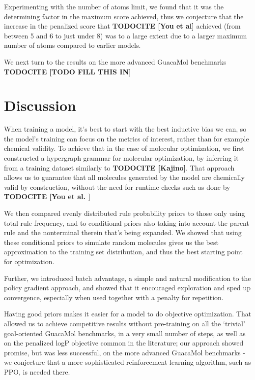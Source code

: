 \documentclass{article}
\newcommand{\CITE}[1]{{\bf TODOCITE [#1]}}
\begin{document}
Experimenting with the number of atoms limit, we found that it was the determining factor in the maximum score achieved, thus we conjecture that the increase in the penalized score that \CITE{You et al} achieved (from between 5 and 6 to just under 8) was to a large extent due to a larger maximum number of atoms compared to earlier models.



We next turn to the results on the more advanced GuacaMol benchmarks \CITE{TODO FILL THIS IN}

\section{Discussion}
When training a model, it's best to start with the best inductive bias we can, so the model's training can focus on the metrics of interest, rather than for example chemical validity. To achieve that in the case of molecular optimization, we first constructed a hypergraph grammar for molecular optimization, by inferring it from a training dataset similarly to \CITE{Kajino}. That approach allows us to guarantee that all molecules generated by the model are chemically valid by construction, without the need for runtime checks such as done by \CITE{You et al. }

We then compared evenly distributed rule probability priors to those only using total rule frequency, and to conditional priors also taking into account the parent rule and the nonterminal therein that's being expanded. We showed that using these conditional priors to simulate random molecules gives us the best approximation to the training set distribution, and thus the best starting point for optimization.

Further, we introduced batch advantage, a simple and natural modification to the policy gradient approach, and showed that it encouraged exploration and sped up convergence, especially when used together with a penalty for repetition.

Having good priors makes it easier for a model to do objective optimization. That allowed us to achieve competitive results without pre-training on all the `trivial' goal-oriented GuacaMol benchmarks, in a very small number of steps, as well as on the penalized logP objective common in the literature;  our approach showed promise, but was less successful, on the more advanced GuacaMol benchmarks - we conjecture that a more sophisticated reinforcement learning algorithm, such as PPO, is needed there.
\end{document}
